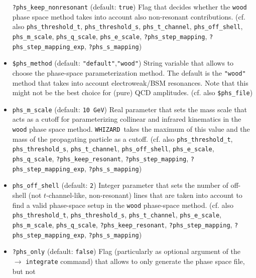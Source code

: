 \documentclass[12pt]{book}
\newcommand{\ttt}[1]{\texttt{#1}}
\newcommand{\whizard}{\texttt{WHIZARD}}
\begin{document}
\begin{itemize}
\ttt{?phs\_keep\_nonresonant} \qquad (default: \ttt{true}) \newline 
Flag that decides whether the \ttt{wood} phase space method takes into
account also non-resonant contributions.  (cf. also \ttt{phs\_threshold\_t},
\ttt{phs\_threshold\_s}, \ttt{phs\_t\_channel}, \ttt{phs\_off\_shell}, 
\ttt{phs\_m\_scale}, \ttt{phs\_q\_scale},
\ttt{phs\_e\_scale}, \ttt{?phs\_step\_mapping},
\newline \ttt{?phs\_step\_mapping\_exp}, 
\ttt{?phs\_s\_mapping}) 
\item
\ttt{\$phs\_method} \qquad (default: \ttt{"default"},\ttt{"wood"})
\newline 
String variable that allows to choose the phase-space parameterization
method. The default is the \ttt{"wood"} method that takes into account
electroweak/BSM resonances. Note that this might not be the best
choice for (pure) QCD amplitudes. (cf. also \ttt{\$phs\_file})
\item
\ttt{phs\_m\_scale} \qquad (default: \ttt{10 GeV}) \newline
Real parameter that sets the mass scale that acts as a cutoff for
parameterizing collinear and infrared kinematics in the \ttt{wood}
phase space method. \whizard\ takes the maximum of this value and the
mass of the propagating particle as a cutoff. (cf. also
\ttt{phs\_threshold\_t}, \ttt{phs\_threshold\_s},
\ttt{phs\_t\_channel}, \ttt{phs\_off\_shell},  \ttt{phs\_e\_scale},
\ttt{phs\_q\_scale}, \newline \ttt{?phs\_keep\_resonant},
\ttt{?phs\_step\_mapping}, \ttt{?phs\_step\_mapping\_exp}, 
\ttt{?phs\_s\_mapping}) 
\item
\ttt{phs\_off\_shell} \qquad (default: \ttt{2}) \newline
Integer parameter that sets the number of off-shell (not
$t$-channel-like, non-resonant) lines that are taken into account to
find a valid phase-space setup in the \ttt{wood} phase-space method. 
(cf. also \ttt{phs\_threshold\_t},
\ttt{phs\_threshold\_s}, \ttt{phs\_t\_channel}, \ttt{phs\_e\_scale}, 
\ttt{phs\_m\_scale}, \ttt{phs\_q\_scale},
\ttt{?phs\_keep\_resonant}, \ttt{?phs\_step\_mapping},
\newline \ttt{?phs\_step\_mapping\_exp}, 
\ttt{?phs\_s\_mapping}) 
\item
\ttt{?phs\_only} \qquad (default: \ttt{false}) \newline
Flag (particularly as optional argument of the $\to$ \ttt{integrate}
command) that allows to only generate the phase space file, but not

\end{itemize}
\end{document}
